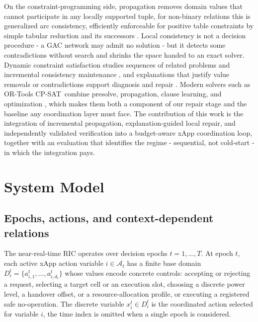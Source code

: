 \documentclass[pdflatex,sn-mathphys-num,iicol,oneside]{sn-jnl}
\newcommand{\cpsat}{\textsc{CP-SAT}}
\begin{document}
On the constraint-programming side, propagation removes domain values
that cannot participate in any locally supported tuple, for non-binary
relations this is generalized arc consistency, efficiently enforceable
for positive table constraints by simple tabular reduction and its
successors \cite{yap2020gac,lecoutre2011str2}. Local consistency is
not a decision procedure - a GAC network may admit no solution - but
it detects some contradictions without search and shrinks the space
handed to an exact solver. Dynamic constraint satisfaction studies
sequences of related problems and incremental consistency maintenance
\cite{bessiere1991dynamic}, and explanations that justify value
removals or contradictions support diagnosis and repair
\cite{gupta2021explanations}. Modern solvers such as OR-Tools \cpsat\
combine presolve, propagation, clause learning, and optimization
\cite{perron2023cpsat,ortools}, which makes them both a component of
our repair stage and the baseline any coordination layer must face.
The contribution of this work is the integration of incremental
propagation, explanation-guided local repair, and independently
validated verification into a budget-aware xApp coordination
loop, together with an evaluation that identifies the regime - 
sequential, not cold-start - in which the integration pays.

\section{System Model}
\label{sec:model}

\subsection{Epochs, actions, and context-dependent relations}

The near-real-time RIC operates over decision epochs $t=1,\ldots,T$.
At epoch $t$, each active xApp action variable $i\in\mathcal{A}_t$ has
a finite base domain $D_i^t=\{a_{i,1}^t,\ldots,a_{i,d_i}^t\}$ whose
values encode concrete controls: accepting or rejecting a request,
selecting a target cell or an execution slot, choosing a discrete
power level, a handover offset, or a resource-allocation profile, or
executing a registered safe no-operation. The discrete variable
$x_i^t\in D_i^t$ is the coordinated action selected for variable $i$,
the time index is omitted when a single epoch is considered.
\end{document}
